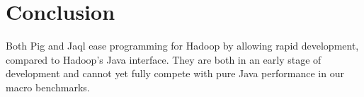 \section{Conclusion}

Both Pig and Jaql ease programming for Hadoop by allowing rapid development, compared to Hadoop's
Java interface. They are both in an early stage of development and cannot yet fully compete with
pure Java performance in our macro benchmarks.